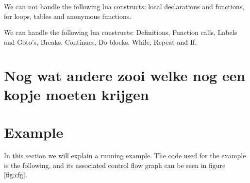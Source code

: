 \documentclass[10pt]{article}
\begin{document}
We can not handle the following lua constructs: local declarations and functions, for loops, tables and anonymous functions.

We can handle the following lua constructs: Definitions, Function calls, Labels and Goto's, Breaks, Continues, Do-blocks, While, Repeat and If.

\section{Nog wat andere zooi welke nog een kopje moeten krijgen}

\section{Example}
In this section we will explain a running example. The code used for the example is the following, and its associated control flow graph can be seen in figure \ref{fig:cfg}.\\
\end{document}
